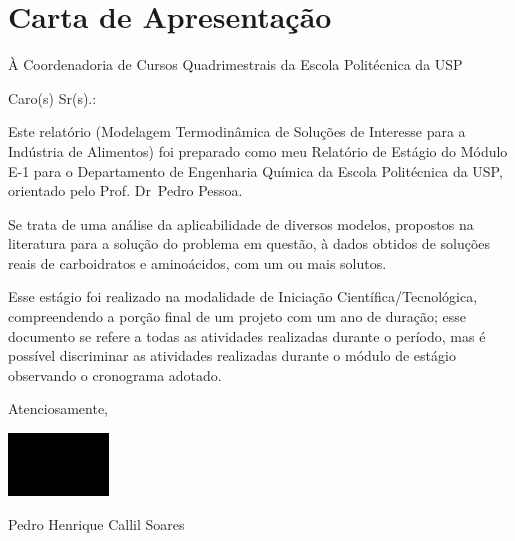 \chapter*{Carta de Apresentação}

À Coordenadoria de Cursos Quadrimestrais da Escola Politécnica da USP

Caro(s) Sr(s).:

\par Este relatório (Modelagem Termodinâmica de Soluções de Interesse para a
Indústria de Alimentos) foi preparado como meu Relatório de Estágio do Módulo
E-1 para o Departamento de Engenharia Química da Escola Politécnica da USP,
orientado pelo Prof\textordmasculine. Dr\textordmasculine\ Pedro Pessoa.

Se trata de uma análise da aplicabilidade de diversos modelos, propostos na
literatura para a solução do problema em questão, à dados obtidos de soluções
reais de carboidratos e aminoácidos, com um ou mais solutos.

Esse estágio foi realizado na modalidade de Iniciação Científica/Tecnológica,
compreendendo a porção final de um projeto com um ano de duração; esse documento
se refere a todas as atividades realizadas durante o período, mas é possível
discriminar as atividades realizadas durante o módulo de estágio observando
o cronograma adotado.

Atenciosamente,

\includegraphics[width=0.2\textwidth]{signature.png}

Pedro Henrique Callil Soares

\newpage
